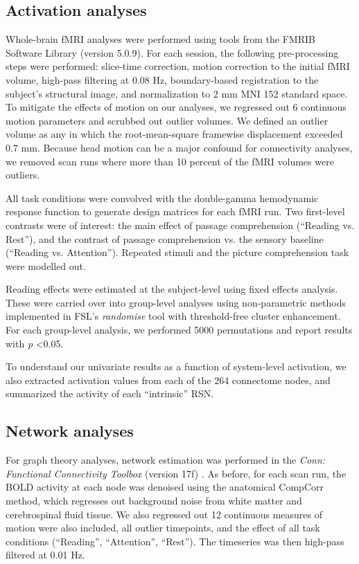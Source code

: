 \subsection{Activation analyses}

Whole-brain fMRI analyses were performed using tools from the FMRIB Software Library (version 5.0.9). For each session, the following pre-processing steps were performed:  slice-time correction, motion correction to the initial fMRI volume, high-pass filtering at 0.08 Hz, boundary-based registration to the subject's structural image, and normalization to 2 mm MNI 152 standard space. To mitigate the effects of motion on our analyses, we regressed out 6 continuous motion parameters and scrubbed out outlier volumes. We defined an outlier volume as any in which the root-mean-square framewise displacement exceeded 0.7 mm. Because head motion can be a major confound for connectivity analyses, we removed scan runs where more than 10 percent of the fMRI volumes were outliers.

All task conditions were convolved with the double-gamma hemodynamic response function to generate design matrices for each fMRI run. Two first-level contrasts were of interest: the main effect of passage comprehension (``Reading vs. Rest''), and the contrast of passage comprehension vs. the sensory baseline (``Reading vs. Attention''). Repeated stimuli and the picture comprehension task were modelled out.

Reading effects were estimated at the subject-level using fixed effects analysis. These were carried over into group-level analyses using non-parametric methods implemented in FSL’s \textit{randomise} tool with threshold-free cluster enhancement. For each group-level analysis, we performed 5000 permutations and report results with \textit{p} \textless 0.05. 

To understand our univariate results as a function of system-level activation, we also extracted activation values from each of the 264 connectome nodes, and summarized the activity of each ``intrinsic'' RSN.

\subsection{Network analyses}

For graph theory analyses, network estimation was performed in the \textit{Conn: Functional Connectivity Toolbox} (version 17f) \citep{WhitfieldGabrieli2012}. As before, for each scan run, the BOLD activity at each node was denoised using the anatomical CompCorr method, which regresses out background noise from white matter and cerebrospinal fluid tissue. We also regressed out 12 continuous measures of motion were also included, all outlier timepoints, and the effect of all task conditions (``Reading'', ``Attention'', ``Rest''). The timeseries was then high-pass filtered at 0.01 Hz.

